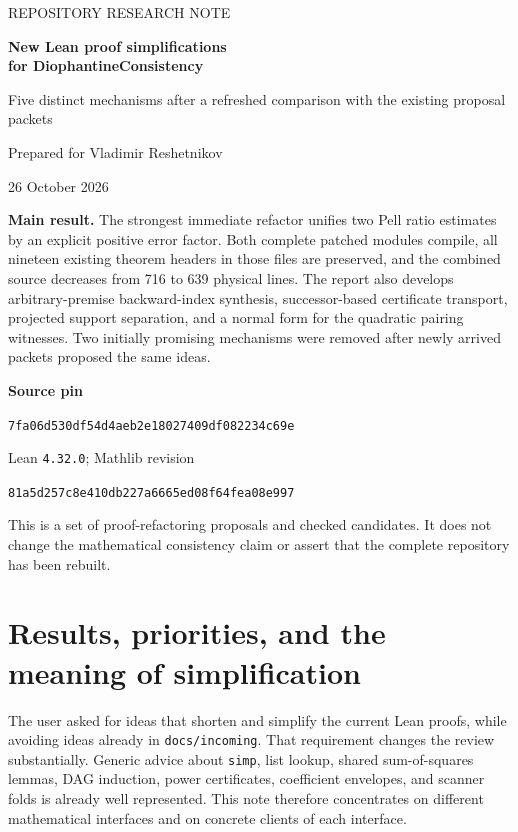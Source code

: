 \documentclass[11pt]{article}
\theoremstyle{remark}\newtheorem{remark}[proposition]{Remark}
\newcommand{\code}[1]{\nolinkurl{#1}}
\begin{document}
\begin{titlepage}
\vspace*{16mm}
{\color{Accent}\large REPOSITORY RESEARCH NOTE\par}
\vspace{8mm}
{\color{Ink}\huge\bfseries New Lean proof simplifications\\for \mbox{DiophantineConsistency}\par}
\vspace{8mm}
{\Large Five distinct mechanisms after a refreshed comparison with the existing proposal packets\par}
\vspace{9mm}
Prepared for Vladimir Reshetnikov\par
26 October 2026\par
\vspace{9mm}
\begin{assessment}
\textbf{Main result.} The strongest immediate refactor unifies two Pell ratio estimates by an explicit positive error factor. Both complete patched modules compile, all nineteen existing theorem headers in those files are preserved, and the combined source decreases from 716 to 639 physical lines. The report also develops arbitrary-premise backward-index synthesis, successor-based certificate transport, projected support separation, and a normal form for the quadratic pairing witnesses. Two initially promising mechanisms were removed after newly arrived packets proposed the same ideas.
\end{assessment}
\vfill
\textbf{Source pin}\par
\small\code{7fa06d530df54d4aeb2e18027409df082234c69e}\par
\normalsize
Lean \code{4.32.0}; Mathlib revision\par
\small\code{81a5d257c8e410db227a6665ed08f64fea08e997}\par
\vspace{6mm}
\normalsize
This is a set of proof-refactoring proposals and checked candidates. It does not change the mathematical consistency claim or assert that the complete repository has been rebuilt.
\end{titlepage}
\tableofcontents
\newpage

\section{Results, priorities, and the meaning of simplification}

The user asked for ideas that shorten and simplify the current Lean proofs, while avoiding ideas already in \code{docs/incoming}. That requirement changes the review substantially. Generic advice about \code{simp}, list lookup, shared sum-of-squares lemmas, DAG induction, power certificates, coefficient envelopes, and scanner folds is already well represented. This note therefore concentrates on different mathematical interfaces and on concrete clients of each interface.
\end{document}
